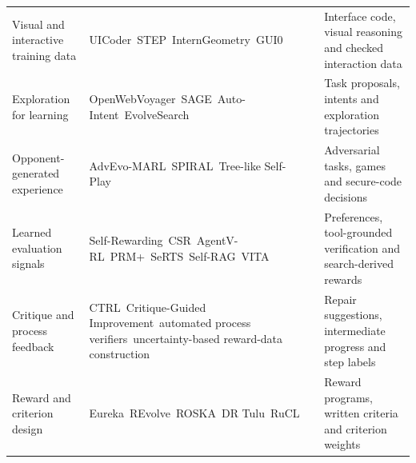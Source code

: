 \begin{longtable}{@{}>{\raggedright\arraybackslash}p{}>{\raggedright\arraybackslash}p{}>{\raggedright\arraybackslash}p{}@{}}
\addlinespace[8pt]
Visual and interactive training data & UICoder~\citep{wu-2024-uicoder}\newline STEP~\citep{Qiu_2025_CVPR}\newline InternGeometry~\citep{zhao2026achieving}\newline GUI0~\citep{wang-etal-2026-gui0} & Interface code, visual reasoning and checked interaction data \\
\addlinespace[8pt]
Exploration for learning & OpenWebVoyager~\citep{he-etal-2025-openwebvoyager}\newline SAGE~\citep{yang2025selfguided}\newline Auto-Intent~\citep{kim-etal-2024-auto}\newline EvolveSearch~\citep{zhang-etal-2025-evolvesearch} & Task proposals, intents and exploration trajectories \\
\addlinespace[8pt]
Opponent-generated experience & AdvEvo-MARL~\citep{pan2026advevomarl}\newline SPIRAL~\citep{liu2026spiral}\newline Tree-like Self-Play~\citep{chen2026learn} & Adversarial tasks, games and secure-code decisions \\
\addlinespace[8pt]
Learned evaluation signals & Self-Rewarding~\citep{pmlr-v235-yuan24d}\newline CSR~\citep{zhou2024calibrated}\newline AgentV-RL~\citep{zhang-etal-2026-agentv}\newline PRM+~\citep{chan-etal-2025-boosting}\newline SeRTS~\citep{hu-etal-2024-serts}\newline Self-RAG~\citep{asai2024selfrag}\newline VITA~\citep{ziakas2026vita} & Preferences, tool-grounded verification and search-derived rewards \\
\addlinespace[8pt]
Critique and process feedback & CTRL~\citep{xie2025teaching}\newline Critique-Guided Improvement~\citep{yang2025the}\newline automated process verifiers~\citep{setlur2025rewarding}\newline uncertainty-based reward-data construction~\citep{Han2026uncertainty} & Repair suggestions, intermediate progress and step labels \\
\addlinespace[8pt]
Reward and criterion design & Eureka~\citep{ma2024eureka}\newline REvolve~\citep{hazra2025revolve}\newline ROSKA~\citep{Huang2025efficient}\newline DR Tulu~\citep{shao2026dr}\newline RuCL~\citep{chen2026rucl} & Reward programs, written criteria and criterion weights \\

\end{longtable}
